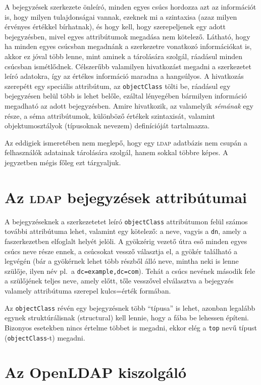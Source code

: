 A bejegyzések szerkezete önleíró, minden egyes csúcs hordozza azt az információt is, hogy milyen tulajdonságai vannak,
ezeknek mi a szintaxisa (azaz milyen érvényes értékkel bírhatnak), és hogy kell, hogy szerepeljenek egy adott
bejegyzésben, mivel egyes attribútumok megadása nem kötelező. Látható, hogy ha  minden egyes csúcsban megadnánk a
szerkezetre vonatkozó információkat is, akkor ez jóval több lenne, mint aminek a tárolására szolgál, ráadásul minden
csúcsban ismétlődnek. Célszerűbb valamilyen hivatkozást megadni a szerkezetet leíró adatokra, így az értékes információ
maradna a hangsúlyos. A hivatkozás szerepétt egy speciális attribútum, az \texttt{objectClass} tölti be, ráadásul egy
bejegyzésen belül több is lehet belőle, ezáltal lényegében bármilyen információ megadható az adott
bejegyzésben. Amire hivatkozik, az valamelyik \emph{sémának} egy része, a séma attribútumok, különböző értékek
szintaxisát, valamint objektumosztályok (típusoknak nevezem) definícióját tartalmazza.

Az eddigiek ismeretében nem meglepő, hogy egy \textsc{ldap} adatbázis nem csupán a felhasználók adatainak tárolására
szolgál, hanem sokkal többre képes. A jegyzetben mégis főleg ezt tárgyaljuk.


\section{Az \textsc{ldap} bejegyzések attribútumai}

A bejegyzéseknek a szerkezetetet leíró \texttt{objectClass} attribútumon felül számos további attribútuma lehet,
valamint egy kötelező: a neve, vagyis a \texttt{dn}, amely a faszerkezetben elfoglalt helyét jelöli. A gyökzérig vezető
útra eső minden egyes csúcs neve része ennek, a csúcsokat vessző választja el, a gyökér található a legvégén (bár a
gyökérnek lehet több részből álló neve, mintha neki is lenne szülője, ilyen név pl.\ a
\texttt{dc=example,dc=com}). Tehát a csúcs nevének második fele a szülőjének teljes neve, amely előtt, tőle vesszővel
elválasztva a bejegyzés valamely attribútuma szerepel kulcs=érték formában.

Az \texttt{objectClass} révén egy bejegyzésnek több ``típusa'' is lehet, azonban legalább egynek struktúrálisnak
(structural) kell lennie, hogy a fába be lehessen építeni. Bizonyos esetekben nincs értelme többet is megadni, ekkor
elég a \texttt{top} nevű típust (\texttt{objectClass}-t) megadni.

\section{Az OpenLDAP kiszolgáló}

